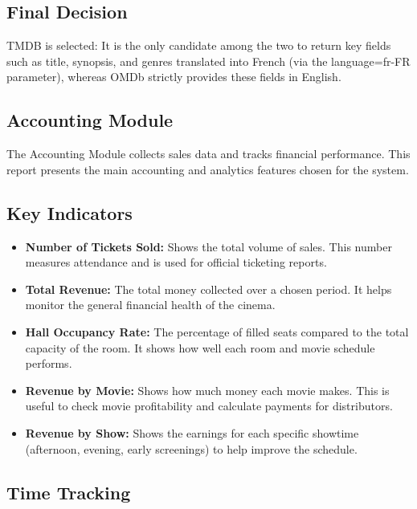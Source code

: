 \documentclass[
  french,
  11pt,
  a4paper,
]{article}
\providecommand{\tightlist}{%
  \setlength{\itemsep}{0pt}\setlength{\parskip}{0pt}}
\begin{document}
\subsection*{Final Decision}\label{final-decision}

TMDB is selected: It is the only candidate among the two to return key
fields such as title, synopsis, and genres translated into French (via
the language=fr-FR parameter), whereas OMDb strictly provides these
fields in English.

\subsection{Accounting Module}\label{accounting-module}

The Accounting Module collects sales data and tracks financial
performance. This report presents the main accounting and analytics
features chosen for the system.

\subsection*{Key Indicators}\label{key-indicators}

\begin{itemize}
\tightlist
\item
  \textbf{Number of Tickets Sold:} Shows the total volume of sales. This
  number measures attendance and is used for official ticketing reports.
\item
  \textbf{Total Revenue:} The total money collected over a chosen
  period. It helps monitor the general financial health of the cinema.
\item
  \textbf{Hall Occupancy Rate:} The percentage of filled seats compared
  to the total capacity of the room. It shows how well each room and
  movie schedule performs.
\item
  \textbf{Revenue by Movie:} Shows how much money each movie makes. This
  is useful to check movie profitability and calculate payments for
  distributors.
\item
  \textbf{Revenue by Show:} Shows the earnings for each specific
  showtime (afternoon, evening, early screenings) to help improve the
  schedule.
\end{itemize}

\subsection*{Time Tracking}\label{time-tracking}
\end{document}
